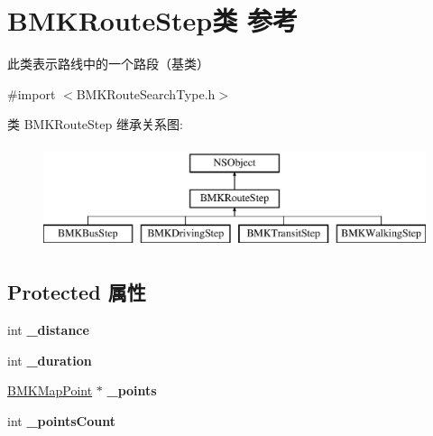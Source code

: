 \hypertarget{interface_b_m_k_route_step}{}\section{B\+M\+K\+Route\+Step类 参考}
\label{interface_b_m_k_route_step}


此类表示路线中的一个路段（基类）  




{\ttfamily \#import $<$B\+M\+K\+Route\+Search\+Type.\+h$>$}

类 B\+M\+K\+Route\+Step 继承关系图\+:\begin{figure}[H]
\begin{center}
\leavevmode
\includegraphics[height=3.000000cm]{interface_b_m_k_route_step}
\end{center}
\end{figure}
\subsection*{Protected 属性}
\begin{DoxyCompactItemize}
\item 
\hypertarget{interface_b_m_k_route_step_ad3cde05d4399b85ec3acd42a7c423c1a}{}int {\bfseries \+\_\+distance}\label{interface_b_m_k_route_step_ad3cde05d4399b85ec3acd42a7c423c1a}

\item 
\hypertarget{interface_b_m_k_route_step_aa51f65db494e87099473478e04bc3e2c}{}int {\bfseries \+\_\+duration}\label{interface_b_m_k_route_step_aa51f65db494e87099473478e04bc3e2c}

\item 
\hypertarget{interface_b_m_k_route_step_a8aa8cc9d1b1c845ecb418fb8ab97f12c}{}\hyperlink{struct_b_m_k_map_point}{B\+M\+K\+Map\+Point} $\ast$ {\bfseries \+\_\+points}\label{interface_b_m_k_route_step_a8aa8cc9d1b1c845ecb418fb8ab97f12c}

\item 
\hypertarget{interface_b_m_k_route_step_aa66e782ce3d4a34af627113e2e41aea1}{}int {\bfseries \+\_\+points\+Count}\label{interface_b_m_k_route_step_aa66e782ce3d4a34af627113e2e41aea1}

\end{DoxyCompactItemize}
